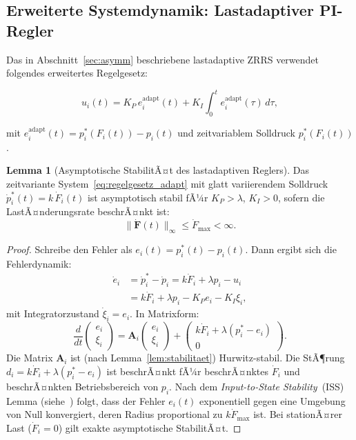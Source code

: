 ﻿\documentclass[a4paper,12pt]{article}
\theoremstyle{definition}
\newtheorem{lemma}{Lemma}
\begin{document}
\subsection{Erweiterte Systemdynamik: Lastadaptiver PI-Regler}

Das in Abschnitt~\ref{sec:asymm} beschriebene lastadaptive ZRRS verwendet
folgendes erweitertes Regelgesetz:

\begin{equation}
    u_i(t) = K_P\, e^{\text{adapt}}_i(t) + K_I \int_0^t e^{\text{adapt}}_i(\tau)\,d\tau,
    \label{eq:regelgesetz_adapt}
\end{equation}

mit $e^{\text{adapt}}_i(t) = p^*_i(F_i(t)) - p_i(t)$ und zeitvariablem
Solldruck $p^*_i(F_i(t))$.

\begin{lemma}[Asymptotische StabilitÃ¤t des lastadaptiven Reglers]
\label{lem:adapt_stab}
Das zeitvariante System~\eqref{eq:regelgesetz_adapt} mit glatt variierendem
Solldruck $\dot{p}^*_i(t) = k\,\dot{F}_i(t)$ ist asymptotisch stabil fÃ¼r
$K_P > \lambda$, $K_I > 0$, sofern die LastÃ¤nderungsrate beschrÃ¤nkt ist:
\[
    \|\dot{\mathbf{F}}(t)\|_\infty \leq \dot{F}_{\max} < \infty.
\]
\end{lemma}

\begin{proof}
Schreibe den Fehler als $e_i(t) = p^*_i(t) - p_i(t)$. Dann ergibt sich
die Fehlerdynamik:
\begin{align*}
    \dot{e}_i &= \dot{p}^*_i - \dot{p}_i
    = k\dot{F}_i + \lambda p_i - u_i\\
    &= k\dot{F}_i + \lambda p_i - K_P e_i - K_I \xi_i,
\end{align*}
mit Integratorzustand $\dot{\xi}_i = e_i$. In Matrixform:
\[
    \frac{d}{dt}\begin{pmatrix}e_i\\\xi_i\end{pmatrix}
    = \mathbf{A}_i\begin{pmatrix}e_i\\\xi_i\end{pmatrix}
    + \begin{pmatrix}k\dot{F}_i + \lambda(p^*_i - e_i)\\0\end{pmatrix}.
\]
Die Matrix $\mathbf{A}_i$ ist (nach Lemma~\ref{lem:stabilitaet})
Hurwitz-stabil. Die StÃ¶rung $d_i = k\dot{F}_i + \lambda(p^*_i - e_i)$
ist beschrÃ¤nkt fÃ¼r beschrÃ¤nktes $\dot{F}_i$ und beschrÃ¤nkten
Betriebsbereich von $p_i$. Nach dem \emph{Input-to-State Stability}~(ISS)
Lemma (siehe~\cite{khalil_nonlinear}) folgt, dass der Fehler $e_i(t)$
exponentiell gegen eine Umgebung von Null konvergiert, deren Radius
proportional zu $k\dot{F}_{\max}$ ist. Bei stationÃ¤rer Last
($\dot{F}_i = 0$) gilt exakte asymptotische StabilitÃ¤t.
\end{proof}
\end{document}

